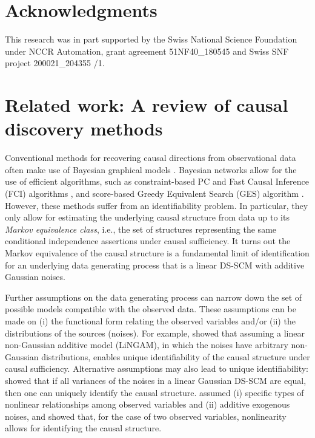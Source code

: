 \documentclass[12pt]{article}
\begin{document}
\vspace{-4mm}
\section*{Acknowledgments}
\vspace{-2mm}
This research was in part supported by the Swiss National Science Foundation under NCCR Automation, grant agreement 51NF40\_180545 and Swiss SNF project 200021\_204355 /1.

\small


\appendix

\section{Related work: A review of causal discovery methods} \label{app:related_work}
Conventional methods for recovering causal directions from observational data often make use of Bayesian graphical models \citep{pearl2009causality,spirtes2000causation}. Bayesian networks allow for the use of efficient algorithms, such as constraint-based PC and Fast Causal Inference (FCI) algorithms \citep{pearl2009causality,spirtes2000causation}, and score-based Greedy Equivalent Search (GES) algorithm \citep{chickering2002optimal}. However, these methods suffer from an identifiability problem. In particular, they only allow for estimating the underlying causal structure from data up to its {\it{Markov equivalence class}}, i.e., the set of structures representing the same conditional independence assertions under causal sufficiency. It turns out the Markov equivalence of the causal structure is a fundamental limit of identification for an underlying data generating process that is a linear DS-SCM with additive Gaussian noises.  

Further assumptions on the data generating process can narrow down the set of possible models compatible with the observed data. These assumptions can be made on (i) the functional form relating the observed variables and/or (ii) the distributions of the sources (noises). For example, \citet{shimizu2006linear} showed that assuming a linear non-Gaussian additive model (LiNGAM), in which the noises have arbitrary non-Gaussian distributions, enables unique identifiability of the causal structure under causal sufficiency. Alternative assumptions may also lead to unique identifiability: \citep{peters2014identifiability} showed that if all variances of the noises in a linear Gaussian DS-SCM are equal, then one can uniquely identify the causal structure.  \citet{hoyer2009nonlinear} assumed (i) specific types of nonlinear relationships among observed variables and (ii) additive exogenous noises, and showed that, for the case of two observed variables, nonlinearity allows for identifying the causal structure. 
\end{document}
